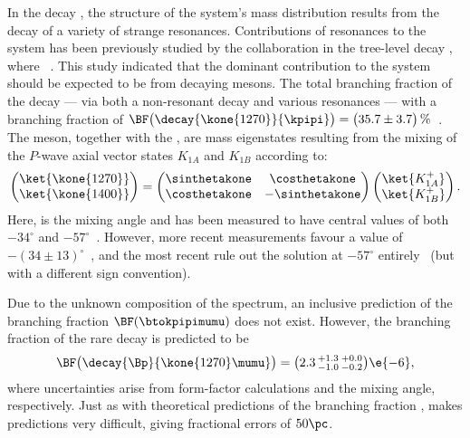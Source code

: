 In the decay \btokpipimumu, the structure of the \kpipi system's mass distribution results from the
decay of a variety of strange resonances.
Contributions of resonances to the \kpipi system has been previously studied by the \belle
collaboration in the tree-level decay \btojpsikpipi, where \jpsitomumu~\cite{Guler:2010if}.
This study indicated that the dominant contribution to the \kpipi system should be expected
to be from decaying  mesons.
The total branching fraction of the decay 
--- via both a non-resonant decay and various resonances ---
with a branching fraction of
$\BF\big(\decay{\kone{1270}}{\kpipi}\big)=\big(35.7\pm3.7\big)\,\%$~\cite{PDG2012}.
The  meson, together with the , are mass eigenstates resulting from the
mixing of the $P$-wave axial vector states $K_{1A}$ and $K_{1B}$ according to:
\begin{equation}
  \begin{pmatrix}
    \ket{\kone{1270}} \\
    \ket{\kone{1400}}
  \end{pmatrix}
  =
  \begin{pmatrix}
    \sinthetakone & \costhetakone \\
    \costhetakone & -\sinthetakone
  \end{pmatrix}
  \begin{pmatrix}
    \ket{K_{1A}^+} \\
    \ket{K_{1B}^+}
  \end{pmatrix}.
  \label{eq:k1mixing}
\end{equation}
Here, \thetakone is the mixing angle and has been measured to have central values of both
$-34^\circ$ and
$-57^\circ$~\cite{PhysRevD.47.1252,Tayduganov:2011ui,Hatanaka:2008xj,Cheng:2011pb,Divotgey:2013jba,Cheng:2013cwa}.
However, more recent measurements favour a value of
$-(34\pm13)^\circ$~\cite{Hatanaka:2008xj,Cheng:2011pb,Divotgey:2013jba,Cheng:2013cwa},
and the most recent rule out the solution at $-57^\circ$
entirely~\cite{Divotgey:2013jba,Cheng:2013cwa}
(but with a different sign convention).

Due to the unknown composition of the \mass{\kpipi} spectrum, an inclusive prediction of the
branching fraction $\BF(\btokpipimumu)$ does not exist.
However, the branching fraction of the rare decay  is predicted to
be~\cite{Hatanaka:2008gu}
\begin{equation}
  \BF\big(\decay{\Bp}{\kone{1270}\mumu}\big) = \big(2.3\,^{+1.3}_{-1.0}\,^{+0.0}_{-0.2}\big)\e{-6},
\end{equation}
where uncertainties arise from form-factor calculations and the mixing angle, respectively.
Just as with theoretical predictions of the branching fraction \btodsphi, \QCD makes predictions
very difficult, giving fractional errors of $50\pc$.



